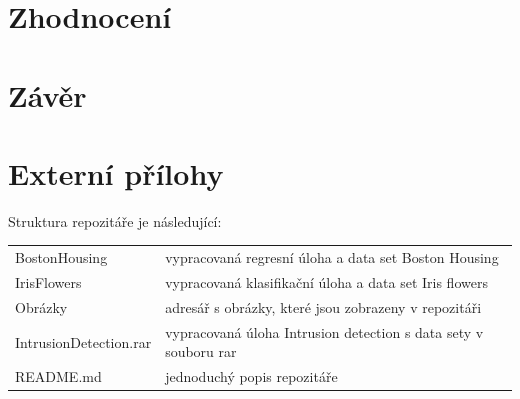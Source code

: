 \documentclass[male,czech,api_ing]{thesis}
\begin{document}
\chapter{Zhodnocení} 

\chapter{Závěr}

\printbibliography[title=Seznam použitých zdrojů]

\listoffigures

\lstlistoflistings

\appendix

\chapter{Externí přílohy\label{sec:ep}}




Struktura repozitáře je následující:
\begin{longtable}{ll}
\hline
BostonHousing & vypracovaná regresní úloha a data set Boston Housing \\
IrisFlowers & vypracovaná klasifikační úloha a data set Iris flowers \\
Obrázky & adresář s obrázky, které jsou zobrazeny v repozitáři \\
IntrusionDetection.rar & vypracovaná úloha Intrusion detection s data sety v souboru rar\\
README.md & jednoduchý popis repozitáře\\
\hline
\end{longtable}

\end{document}
